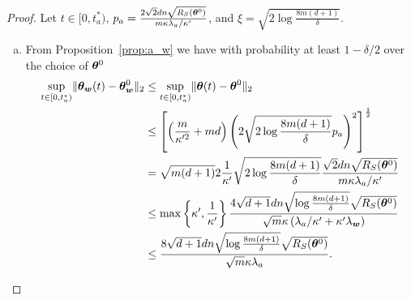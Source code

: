 \documentclass[twoside,11pt]{article}
\begin{document}
\begin{proof}
    Let $t\in[0, t^*_a)$, $p_a=\frac{2\sqrt{2}dn\sqrt{R_S(\bm{\theta}^0)}}{m\kappa\lambda_a/\kappa'}$, and $\xi=\sqrt{2\log\frac{8m(d+1)}{\delta}}$.
    \begin{enumerate}[(a)]
        \item From Proposition~\ref{prop:a_w} we have with probability at least $1-\delta/2$ over the choice of $\bm{\theta}^0$
              \begin{equation*}
                  \begin{aligned}
                      \sup\limits_{t\in[0,t^*_a)}\lVert\bm{\theta}_{\bm{w}}(t)-\bm{\theta}_{\bm{w}}^0\rVert_2
                       & \leq \sup\limits_{t\in[0,t^*_a)}\lVert\bm{\theta}(t)-\bm{\theta}^0\rVert_2                                                                                                                                 \\
                       & \leq \left[\left(\frac{m}{\kappa'^2}+md\right)\left(2\sqrt{2\log\frac{8m(d+1)}{\delta}}p_a\right)^2\right]^{\frac{1}{2}}                                                                      \\
                       & =\sqrt{m(d+1)}2\frac{1}{\kappa'}\sqrt{2\log\frac{8m(d+1)}{\delta}}\frac{\sqrt{2}dn\sqrt{R_S(\bm{\theta}^0)}}{m\kappa\lambda_a/\kappa'}                                                            \\
                       & \leq\max\left\{\kappa',\frac{1}{\kappa'}\right\}\frac{4\sqrt{d+1}dn\sqrt{\log\frac{8m(d+1)}{\delta}}\sqrt{R_S(\bm{\theta}^0)}}{\sqrt{m}\kappa\left(\lambda_a/\kappa'+\kappa'\lambda_{\bm{w}}\right)} \\
                       & \leq\frac{8\sqrt{d+1}dn\sqrt{\log\frac{8m(d+1)}{\delta}}\sqrt{R_S(\bm{\theta}^0)}}{\sqrt{m}\kappa\lambda_a}.
                  \end{aligned}
              \end{equation*}


\end{enumerate}
\end{proof}
\end{document}
